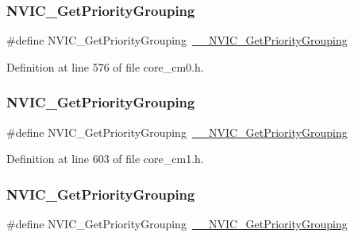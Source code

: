 \subsubsection{\texorpdfstring{N\+V\+I\+C\+\_\+\+Get\+Priority\+Grouping}{NVIC\_GetPriorityGrouping}\hspace{0.1cm}{\footnotesize\ttfamily [1/11]}}
{\footnotesize\ttfamily \#define N\+V\+I\+C\+\_\+\+Get\+Priority\+Grouping~\hyperlink{group___c_m_s_i_s___core___n_v_i_c_functions_ga9b894af672df4373eb637f8288845c05}{\+\_\+\+\_\+\+N\+V\+I\+C\+\_\+\+Get\+Priority\+Grouping}}



Definition at line 576 of file core\+\_\+cm0.\+h.

\mbox{\label{group___c_m_s_i_s___core___n_v_i_c_functions_ga4eeb9214f2264fc23c34ad5de2d3fa11}} 
\subsubsection{\texorpdfstring{N\+V\+I\+C\+\_\+\+Get\+Priority\+Grouping}{NVIC\_GetPriorityGrouping}\hspace{0.1cm}{\footnotesize\ttfamily [2/11]}}
{\footnotesize\ttfamily \#define N\+V\+I\+C\+\_\+\+Get\+Priority\+Grouping~\hyperlink{group___c_m_s_i_s___core___n_v_i_c_functions_ga9b894af672df4373eb637f8288845c05}{\+\_\+\+\_\+\+N\+V\+I\+C\+\_\+\+Get\+Priority\+Grouping}}



Definition at line 603 of file core\+\_\+cm1.\+h.

\mbox{\label{group___c_m_s_i_s___core___n_v_i_c_functions_ga4eeb9214f2264fc23c34ad5de2d3fa11}} 
\subsubsection{\texorpdfstring{N\+V\+I\+C\+\_\+\+Get\+Priority\+Grouping}{NVIC\_GetPriorityGrouping}\hspace{0.1cm}{\footnotesize\ttfamily [3/11]}}
{\footnotesize\ttfamily \#define N\+V\+I\+C\+\_\+\+Get\+Priority\+Grouping~\hyperlink{group___c_m_s_i_s___core___n_v_i_c_functions_ga9b894af672df4373eb637f8288845c05}{\+\_\+\+\_\+\+N\+V\+I\+C\+\_\+\+Get\+Priority\+Grouping}}



